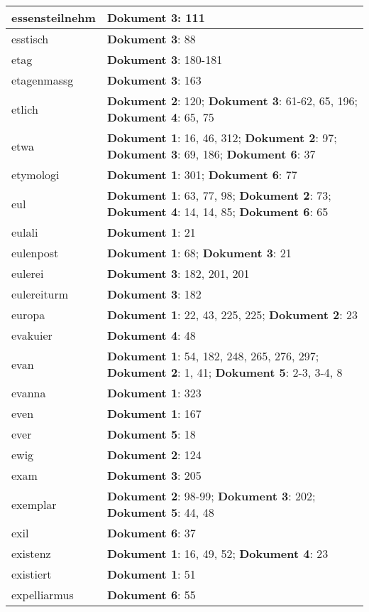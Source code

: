 \documentclass[a5paper]{article}
\begin{document}
\begin{longtable}[l]{|l|p{3in}|}
\hline
essensteilnehm & \textbf{Dokument 3}: 111 \\
\hline
esstisch & \textbf{Dokument 3}: 88 \\
\hline
etag & \textbf{Dokument 3}: 180-181 \\
\hline
etagenmassg & \textbf{Dokument 3}: 163 \\
\hline
etlich & \textbf{Dokument 2}: 120; \textbf{Dokument 3}: 61-62, 65, 196; \textbf{Dokument 4}: 65, 75 \\
\hline
etwa & \textbf{Dokument 1}: 16, 46, 312; \textbf{Dokument 2}: 97; \textbf{Dokument 3}: 69, 186; \textbf{Dokument 6}: 37 \\
\hline
etymologi & \textbf{Dokument 1}: 301; \textbf{Dokument 6}: 77 \\
\hline
eul & \textbf{Dokument 1}: 63, 77, 98; \textbf{Dokument 2}: 73; \textbf{Dokument 4}: 14, 14, 85; \textbf{Dokument 6}: 65 \\
\hline
eulali & \textbf{Dokument 1}: 21 \\
\hline
eulenpost & \textbf{Dokument 1}: 68; \textbf{Dokument 3}: 21 \\
\hline
eulerei & \textbf{Dokument 3}: 182, 201, 201 \\
\hline
eulereiturm & \textbf{Dokument 3}: 182 \\
\hline
europa & \textbf{Dokument 1}: 22, 43, 225, 225; \textbf{Dokument 2}: 23 \\
\hline
evakuier & \textbf{Dokument 4}: 48 \\
\hline
evan & \textbf{Dokument 1}: 54, 182, 248, 265, 276, 297; \textbf{Dokument 2}: 1, 41; \textbf{Dokument 5}: 2-3, 3-4, 8 \\
\hline
evanna & \textbf{Dokument 1}: 323 \\
\hline
even & \textbf{Dokument 1}: 167 \\
\hline
ever & \textbf{Dokument 5}: 18 \\
\hline
ewig & \textbf{Dokument 2}: 124 \\
\hline
exam & \textbf{Dokument 3}: 205 \\
\hline
exemplar & \textbf{Dokument 2}: 98-99; \textbf{Dokument 3}: 202; \textbf{Dokument 5}: 44, 48 \\
\hline
exil & \textbf{Dokument 6}: 37 \\
\hline
existenz & \textbf{Dokument 1}: 16, 49, 52; \textbf{Dokument 4}: 23 \\
\hline
existiert & \textbf{Dokument 1}: 51 \\
\hline
expelliarmus & \textbf{Dokument 6}: 55 \\

\end{longtable}
\end{document}

